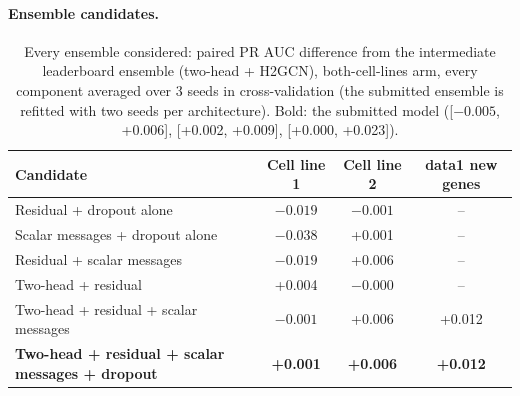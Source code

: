\documentclass[11pt,a4paper]{article}
\begin{document}
\paragraph{Ensemble candidates.}
\begin{table}[H]
    \centering\small
    \begin{tabular}{lccc}
        \toprule
        \textbf{Candidate} & \textbf{Cell line 1} & \textbf{Cell line 2} & \textbf{data1 new genes} \\
        \midrule
        Residual + dropout alone & $-0.019$ & $-0.001$ & -- \\
        Scalar messages + dropout alone & $-0.038$ & +0.001 & -- \\
        Residual + scalar messages & $-0.019$ & +0.006 & -- \\
        Two-head + residual & +0.004 & $-0.000$ & -- \\
        Two-head + residual + scalar messages & $-0.001$ & +0.006 & +0.012 \\
        \textbf{Two-head + residual + scalar messages + dropout} & \textbf{+0.001} & \textbf{+0.006} & \textbf{+0.012} \\
        \bottomrule
    \end{tabular}
    \caption{Every ensemble considered: paired PR AUC difference from the intermediate leaderboard
    ensemble (two-head + H2GCN), both-cell-lines arm, every component
    averaged over 3 seeds in cross-validation (the submitted ensemble is refitted with two seeds per architecture). Bold: the submitted model ([$-0.005$, +0.006],
    [+0.002, +0.009], [+0.000, +0.023]).}
    \label{tab:ensembles}
\end{table}
\end{document}
